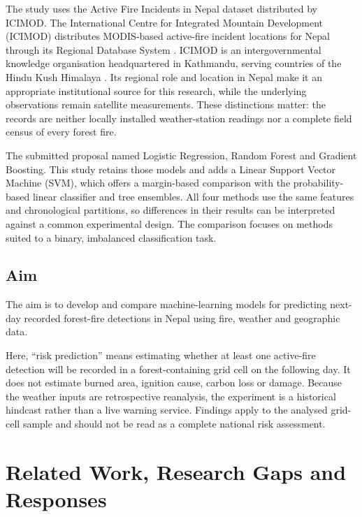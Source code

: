 \documentclass[conference,a4paper]{IEEEtran}
\begin{document}
The study uses the Active Fire Incidents in Nepal dataset distributed by ICIMOD. The International Centre for Integrated Mountain Development (ICIMOD) distributes MODIS-based active-fire incident locations for Nepal through its Regional Database System \citep{icimodfire}. ICIMOD is an intergovernmental knowledge organisation headquartered in Kathmandu, serving countries of the Hindu Kush Himalaya \citep{icimodabout}. Its regional role and location in Nepal make it an appropriate institutional source for this research, while the underlying observations remain satellite measurements. These distinctions matter: the records are neither locally installed weather-station readings nor a complete field census of every forest fire.

The submitted proposal named Logistic Regression, Random Forest and Gradient Boosting. This study retains those models and adds a Linear Support Vector Machine (SVM), which offers a margin-based comparison with the probability-based linear classifier and tree ensembles. All four methods use the same features and chronological partitions, so differences in their results can be interpreted against a common experimental design. The comparison focuses on methods suited to a binary, imbalanced classification task.

\subsection{Aim}
The aim is to develop and compare machine-learning models for predicting next-day recorded forest-fire detections in Nepal using fire, weather and geographic data.

Here, “risk prediction” means estimating whether at least one active-fire detection will be recorded in a forest-containing grid cell on the following day. It does not estimate burned area, ignition cause, carbon loss or damage. Because the weather inputs are retrospective reanalysis, the experiment is a historical hindcast rather than a live warning service. Findings apply to the analysed grid-cell sample and should not be read as a complete national risk assessment.

\section{Related Work, Research Gaps and Responses}
\end{document}
